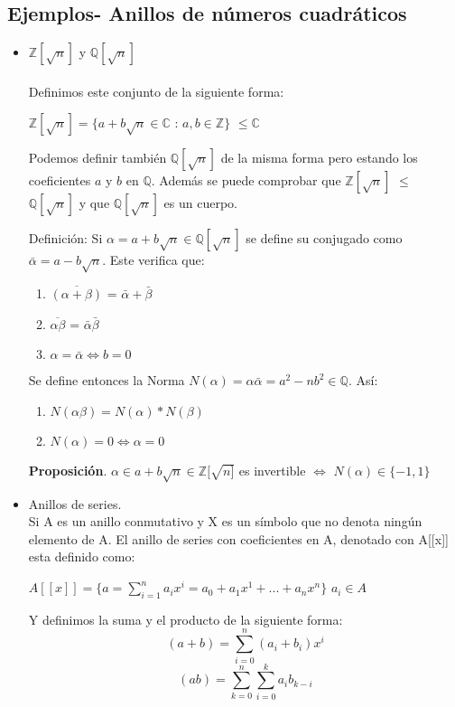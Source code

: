 \documentclass[11pt]{article}
\providecommand{\rac}{\mathbb{Q}}
\providecommand{\ent}{\mathbb{Z}}
\providecommand{\sii}{\Leftrightarrow}
\begin{document}
\subsection{Ejemplos- Anillos de números cuadráticos}

\begin{itemize}
\item $\mathbb{Z}[\sqrt{n}]$ y $\mathbb{Q}[\sqrt{n}]$\\\\
Definimos este conjunto de la siguiente forma:\\
\begin{center}$\mathbb{Z}[\sqrt{n}] = \{a+b\sqrt{n} \in \mathbb{C}$ : $a,b \in \mathbb{Z} \}$ $\leq \mathbb{C}$\end{center}

Podemos definir también $\mathbb{Q}[\sqrt{n}]$ de la misma forma pero estando los coeficientes $a$ y $b$ en $\mathbb{Q}$. Además se puede comprobar que $\mathbb{Z}[\sqrt{n}]$ $\leq$ $\mathbb{Q}[\sqrt{n}]$ y que $\mathbb{Q}[\sqrt{n}]$ es un cuerpo.

Definición: Si $\alpha = a+b\sqrt{n}\in \mathbb{Q}[\sqrt{n}]$ se define su conjugado como $\bar{\alpha} = a - b\sqrt{n}$. Este verifica que:
\begin{enumerate}

\item $ \overline{(\alpha+ \beta)} $ = $\bar{\alpha} + \bar{\beta}$
\item $\overline{\alpha \beta}$ = $\bar{\alpha}\bar{\beta}$
\item $\alpha = \bar{\alpha} \Leftrightarrow b = 0$
	
\end{enumerate} 

Se define entonces la Norma $N(\alpha) = \alpha \bar{\alpha} = a^2 - nb^2 \in \rac $. Así:
\begin{enumerate}
	\item $N(\alpha \beta) = N(\alpha) * N(\beta)$
	\item $N(\alpha) = 0 \sii \alpha = 0$
\end{enumerate}

\textbf{Proposición}.
$\alpha \in a + b \sqrt{n} \in \ent[\sqrt{n]}$ es invertible $\sii$ $N(\alpha) \in \{-1,1\}$

\item Anillos de series.\\
Si A es un anillo conmutativo y X es un símbolo que no denota ningún elemento de A. El anillo de series con coeficientes en A, denotado con A[[x]] esta definido como:\begin{center}
$A[[x]] = \{a = \sum_{i=1}^{n}a_i x^i = a_0 + a_1 x^1 + ... + a_n x^n\}$ $a_i \in A$\end{center}
Y definimos la suma y el producto de la siguiente forma:\\
\[(a+b) = \sum_{i=0}^{n}(a_i+b_i)x^i\]\[ (ab) = \sum_{k=0}^n\sum_{i=0}^{k}a_ib_{k-i}\]
\end{itemize}
\end{document}
